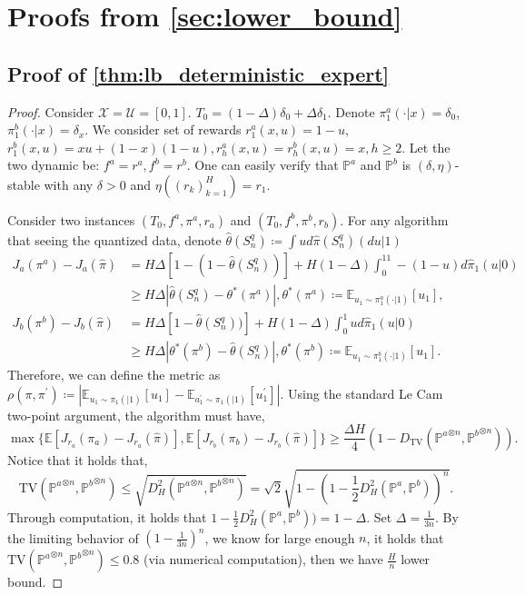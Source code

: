\documentclass{article}
\begin{document}
\section{Proofs from \texorpdfstring{\cref{sec:lower_bound}}{Section 5}}

\subsection{Proof of \texorpdfstring{\cref{thm:lb_deterministic_expert}}{Theorem 8}}

\begin{proof}
    Consider $\mathcal X = \mathcal U = [0,1]$. $T_0 =(1-\Delta)\delta_0 + \Delta\delta_{1}$. Denote $\pi^a_1(\cdot|x)=\delta_{0}$, $\pi^b_1(\cdot|x)=\delta_{x}$. We consider set of rewards $r^a_1(x,u)=1-u$, $r^b_1(x,u)=xu+(1-x)(1-u), r^a_h(x,u)=r^b_h(x,u)=x, h\geq 2$. 
    Let the two dynamic be: $f^a=r^a, f^b=r^b$. One can easily verify that $\mathbb P^{a}$ and $\mathbb P^{b}$ is $(\delta, \eta)$-stable with any $\delta>0$ and $\eta\left((r_k)_{k=1}^H\right)=r_1$.
        
    Consider two instances $(T_0, f^a, \pi^a, r_a)$ and $(T_0, f^b, \pi^b, r_b)$. For any algorithm that seeing the quantized data, denote $\hat \theta(S_n^q)\coloneqq  \int ud\hat \pi(S_n^q)(du|1)$
    \begin{align*}
        J_{a}(\pi^a) -J_{a}(\hat \pi) &= H\Delta[1-(1-\hat \theta(S_n^q))]+H(1-\Delta)\int_0^11-(1-u)d\hat \pi_1(u|0)\\&\geq H\Delta|\hat \theta(S_n^q)-\theta^*(\pi^a)|,\theta^*(\pi^a)\coloneqq  \mathbb E_{u_1\sim\pi_1^a(\cdot|1)}[u_1],\\
        J_{b}(\pi^b) -J_{b}(\hat \pi) &= H\Delta[1-\hat \theta(S_n^q))]+H(1-\Delta)\int_0^1ud\hat \pi_1(u|0)\\&\geq H\Delta|\theta^*(\pi^b)-\hat \theta(S_n^q)|,\theta^*(\pi^b)\coloneqq  \mathbb E_{u_1\sim\pi_1^b(\cdot|1)}[u_1].
    \end{align*}
    Therefore, we can define the metric as $\rho(\pi, \pi^\prime) \coloneqq  |\mathbb E_{u_1\sim \pi_1(|1)}[u_1]-\mathbb E_{a_1^\prime\sim \pi_1(|1)}[u_1^\prime]|$. Using the standard Le Cam two-point argument, the algorithm must have,
    \begin{equation*}
        \max\{\mathbb E[J_{r_a}(\pi_a)-J_{r_a}(\hat \pi)],\mathbb E[J_{r_b}(\pi_b)-J_{r_b}(\hat \pi)]\}\geq \frac{\Delta H}{4}(1-D_{\text{TV}}({\mathbb P^a}^{\otimes n}, {\mathbb P^b}^{\otimes n})).
    \end{equation*}
    Notice that it holds that,
    \begin{equation*}
        {\text{TV}}({\mathbb P^a}^{\otimes n}, {\mathbb P^b}^{\otimes n})\leq \sqrt {D^2_{H}({\mathbb P^a}^{\otimes n}, {\mathbb P^b}^{\otimes n})}= \sqrt{2}\sqrt{1-(1-\frac{1}{2}D^2_{H}(\mathbb P^a, \mathbb P^b))^n}.
    \end{equation*}
    Through computation, it holds that $1-\frac{1}{2}D^2_{H}(\mathbb P^a, \mathbb P^b))=1-\Delta$.
    Set $\Delta = \frac{1}{3n}$. By the limiting behavior of $(1-\frac{1}{3n})^n$, we know for large enough $n$, it holds that ${\text{TV}}({\mathbb P^a}^{\otimes n}, {\mathbb P^b}^{\otimes n})\leq 0.8$ (via numerical computation), then we have $\frac{H}{n}$ lower bound.


\end{proof}
\end{document}
